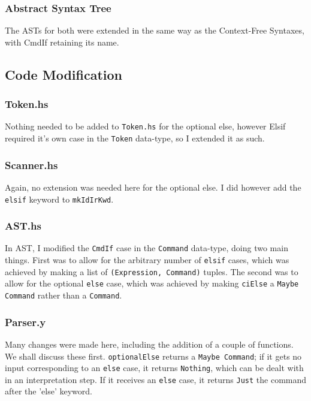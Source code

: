 \documentclass[12pt]{article}
\newcommand{\lstin}[3]{
  
}
\begin{document}
\subsubsection{Abstract Syntax Tree}
The ASTs for both were extended in the same way as the Context-Free Syntaxes, with CmdIf retaining its name.

\subsection{Code Modification}
\subsubsection{Token.hs}
Nothing needed to be added to \verb|Token.hs| for the optional else, however Elsif required it's own case in the \verb|Token| data-type, so I extended it as such.

\lstin{49}{49}{Token.hs}

\subsubsection{Scanner.hs}
Again, no extension was needed here for the optional else. 
I did however add the \verb|elsif| keyword to \verb|mkIdIrKwd|.

\lstin{155}{155}{Scanner.hs}

\subsubsection{AST.hs}
In AST, I modified the \verb|CmdIf| case in the \verb|Command| data-type, doing two main things. 
First was to allow for the arbitrary number of \verb|elsif| cases, which was achieved by making a list of \verb|(Expression, Command)| tuples. 
The second was to allow for the optional \verb|else| case, which was achieved by making \verb|ciElse| a \verb|Maybe Command| rather than a \verb|Command|.

\lstin{101}{105}{AST.hs}

\subsubsection{Parser.y}
Many changes were made here, including the addition of a couple of functions. 
We shall discuss these first. 
\verb|optionalElse| returns a \verb|Maybe Command|; if it gets no input corresponding to an \verb|else| case, it returns \verb|Nothing|, which can be dealt with in an interpretation step. 
If it receives an \verb|else| case, it returns \verb|Just| the command after the 'else' keyword.
\end{document}

